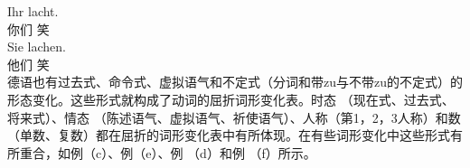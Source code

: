 \ex 
\gll Ihr lacht.\\
     你们 笑\\
\ex 
\gll Sie lachen.\\
     他们 笑\\
\zl
德语也有过去式、命令式、虚拟语气和不定式（分词和带zu与不带zu的不定式）的形态变化。这些形式就构成了动词的屈折词形变化表。时态 （现在式、过去式、将来式）、情态 （陈述语气、虚拟语气、祈使语气）、人称（第1，2，3人称）和数（单数、复数）都在屈折的词形变化表中有所体现。在有些词形变化中这些形式有所重合，如例（c）、例（e）、例 （d）和例 （f）所示。

